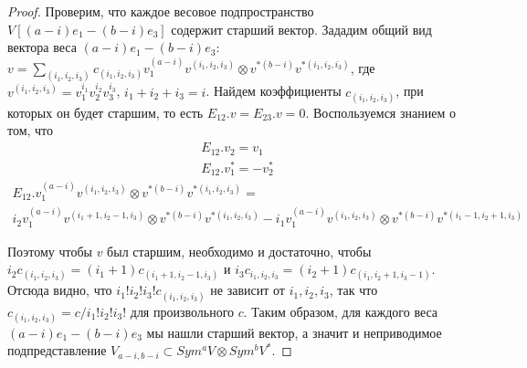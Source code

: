 \documentclass[a4article]{article}
\begin{document}
\begin{proof}
    Проверим, что каждое весовое подпространство $V[(a-i)e_1-(b-i)e_3]$ содержит  старший вектор. Зададим общий вид вектора веса $(a-i)e_1-(b-i)e_3$: $v = \sum_{(i_1, i_2, i_3)}c_{(i_1, i_2, i_3)}v_1^{(a-i)}v^{(i_1, i_2, i_3)}\otimes v^{*(b-i)}v^{*(i_1, i_2, i_3)}$, где $v^{(i_1, i_2, i_3)}=v_1^{i_1}v_2^{i_2}v_3^{i_3}$, $i_1+i_2+i_3=i$. Найдем коэффициенты $c_{(i_1, i_2, i_3)}$, при которых он будет старшим, то есть $E_{12}.v=E_{23}.v=0$.
    Воспользуемся знанием о том, что \begin{equation}
        \begin{gathered}
            E_{12}.v_2=v_1\\
            E_{12}.v_1^*=-v_2^*
        \end{gathered}
    \end{equation}
    \begin{equation}
    \begin{gathered}
        E_{12}.v_1^{(a-i)}v^{(i_1, i_2, i_3)}\otimes v^{*(b-i)}v^{*(i_1, i_2, i_3)} = \\
        i_2v_1^{(a-i)}v^{(i_1+1, i_2-1, i_3)}\otimes v^{*(b-i)}v^{*(i_1, i_2, i_3)}-i_1v_1^{(a-i)}v^{(i_1, i_2, i_3)}\otimes v^{*(b-i)}v^{*(i_1-1, i_2+1, i_3)}
    \end{gathered}
    \end{equation}
    
    Поэтому чтобы $v$ был старшим, необходимо и достаточно, чтобы $i_2c_{(i_1, i_2, i_3)}=(i_1+1)c_{(i_1+1, i_2-1, i_3)}$ и 
    $i_3c_{i_1,i_2,i_3}=(i_2+1)c_{(i_1, i_2+1, i_3-1)}$. Отсюда видно, что $i_1!i_2!i_3!c_{(i_1, i_2, i_3)}$ не зависит от $i_1, i_2, i_3$, так что $c_{(i_1, i_2, i_3)}=c/i_1!i_2!i_3!$ для произвольного $c$. Таким образом, для каждого веса $(a-i)e_1-(b-i)e_3$ мы нашли старший вектор, а значит и неприводимое подпредставление $V_{a-i, b-i} \subset Sym^a V \otimes Sym^b V^*$.
\end{proof}
\end{document}
